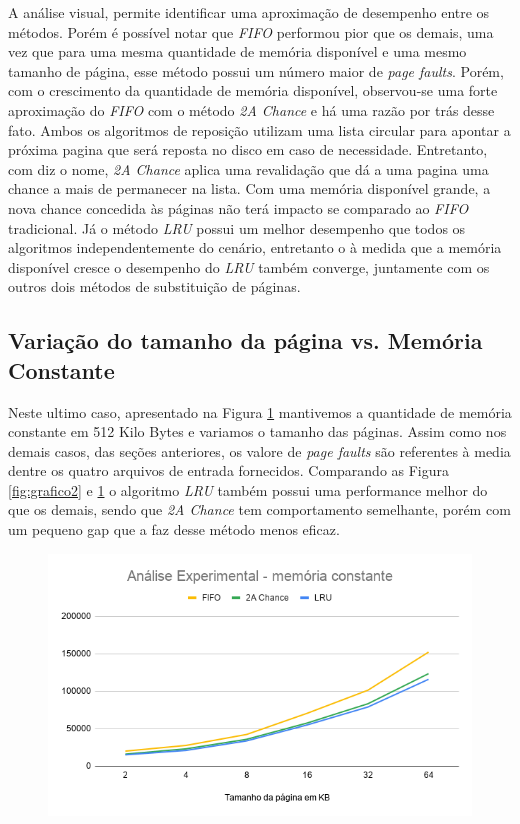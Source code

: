 A análise visual, permite identificar uma aproximação de desempenho entre os métodos.
Porém é possível notar que \textit{FIFO} performou pior que os demais, uma vez que para
uma mesma quantidade de memória disponível e uma mesmo tamanho de página, esse método
possui um número maior de \textit{page faults}.
Porém, com o crescimento da quantidade de memória disponível, observou-se uma forte
aproximação do \textit{FIFO} com o método \textit{2A Chance} e há uma razão
por trás desse fato.
Ambos os algoritmos de reposição utilizam uma lista circular para apontar a próxima
pagina que será reposta no disco em caso de necessidade.
Entretanto, com diz o nome, \textit{2A Chance} aplica uma revalidação que dá a uma pagina
uma chance a mais de permanecer na lista.
Com uma memória disponível grande, a nova chance concedida às páginas não terá impacto
se comparado ao \textit{FIFO} tradicional.
Já o método \textit{LRU} possui um melhor desempenho que todos os algoritmos
independentemente do cenário, entretanto o à medida que a memória disponível cresce
o desempenho do \textit{LRU} também converge, juntamente com os outros dois métodos
de substituição de páginas.


\subsection{Variação do tamanho da página vs. Memória Constante}
Neste ultimo caso, apresentado na Figura \ref{fig:grafico3} mantivemos a quantidade
de memória constante em 512 Kilo Bytes e variamos o tamanho das páginas.
Assim como nos demais casos, das seções anteriores, os valore de \textit{page faults}
são referentes à media dentre os quatro arquivos de entrada fornecidos.
Comparando as Figura \ref{fig:grafico2} e \ref{fig:grafico3} o algoritmo
\textit{LRU} também possui
uma performance melhor do que os demais, sendo que \textit{2A Chance} tem 
comportamento semelhante, porém com um pequeno gap que a faz desse método menos
eficaz.


\begin{figure}[h]
	\begin{center}
		\includegraphics[scale=0.7]{Figuras/img3.png}
	\end{center}
	\caption{\label{fig:grafico3} }
\end{figure}

